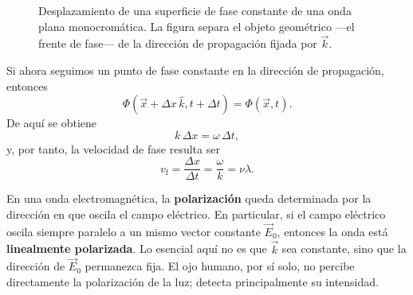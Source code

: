 \documentclass[12pt,a4paper]{article}
\theoremstyle{definition}
\theoremstyle{plain}
\numberwithin{equation}{section}
\theoremstyle{remark}
\begin{document}
\begin{figure}[ht]
    \endgroup
    \caption{Desplazamiento de una superficie de fase constante de una onda plana monocromática. La figura separa el objeto geométrico ---el frente de fase--- de la dirección de propagación fijada por $\vec k$.}
    \label{fig:avance-frente-fase}
\end{figure}




Si ahora seguimos un punto de fase constante en la dirección de propagación, entonces
\begin{equation*}
    \Phi(\vec x+\Delta x\,\hat k,t+\Delta t)=\Phi(\vec x,t).
\end{equation*}
De aquí se obtiene
\begin{equation*}
    k\,\Delta x=\omega\,\Delta t,
\end{equation*}
y, por tanto, la velocidad de fase resulta ser
\begin{equation*}
    v_{\mathrm f}=\frac{\Delta x}{\Delta t}=\frac{\omega}{k}=\nu\lambda.
\end{equation*}

En una onda electromagnética, la \textbf{polarización} queda determinada por la dirección en que oscila el campo eléctrico. En particular, si el campo eléctrico oscila siempre paralelo a un mismo vector constante $\vec E_0$, entonces la onda está \textbf{linealmente polarizada}. Lo esencial aquí no es que $\vec k$ sea constante, sino que la dirección de $\vec E_0$ permanezca fija. El ojo humano, por sí solo, no percibe directamente la polarización de la luz; detecta principalmente su intensidad.
\end{document}
